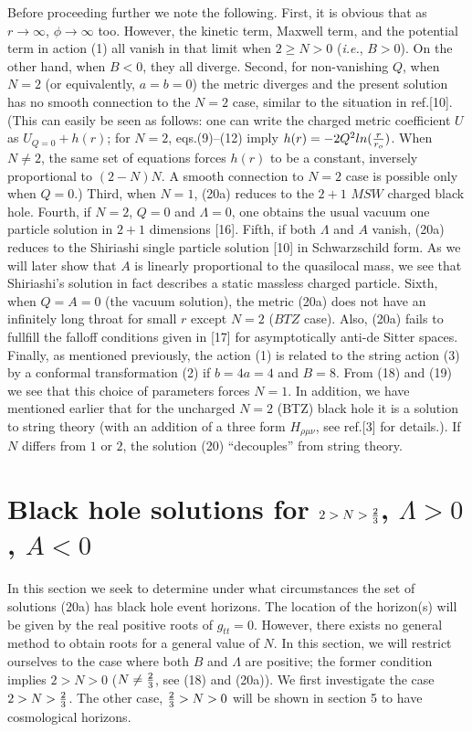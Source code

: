 Before proceeding further we note the following.
First, it is obvious that as $r\rightarrow\infty$,
$\phi\rightarrow\infty$ too. However, the kinetic term,
Maxwell term, and the potential term in action (1)
all vanish in that limit when $2\geq N>0$ ({\sl i.e.}, $B>0$).
On the other hand, when $B<0$, they all diverge. Second, for
non-vanishing $Q$, when $N=2$ (or equivalently, $a=b=0$)
the metric diverges and the
present solution has no smooth connection to the $N=2$ case, similar to the
situation in ref.[10]. (This can easily be seen as follows: one can
write the charged metric coefficient $U$ as $U_{Q=0}+h(r)$; for $N=2$,
eqs.(9)--(12) imply $h(r)=-2Q^2ln({r\over r_o})$. When $N\ne 2$, the same
set of equations forces $h(r)$ to be a constant, inversely proportional to
$(2-N)N$. A smooth connection to $N=2$ case is possible only when $Q=0$.)
Third, when $N=1$, (20a) reduces to the $2+1$ $MSW$ charged black hole.
Fourth, if $N=2$, $Q=0$ and $\Lambda=0$, one obtains the usual vacuum one
particle solution in $2+1$ dimensions [16]. Fifth, if both $\Lambda$ and
$A$ vanish, (20a) reduces to the Shiriashi single particle solution [10] in
Schwarzschild form. As we will later show that $A$ is linearly proportional
to the quasilocal mass, we see that Shiriashi's solution in fact describes
a static massless charged particle. Sixth, when $Q=A=0$ (the vacuum
solution), the metric (20a) does not have an infinitely long throat for small
$r$ except $N=2$ ($BTZ$ case). Also, (20a) fails to fullfill the falloff
conditions given in [17] for asymptotically anti-de Sitter spaces. Finally,
as mentioned previously, the action (1) is related to the string action (3)
by a conformal transformation (2) if $b=4a=4$ and $B=8$. From (18) and (19)
we see that this choice of parameters forces $N=1$. In addition,
we have mentioned earlier that for the uncharged $N=2$ (BTZ) black hole
it is a solution to string theory
(with an addition of a three form $H_{{\rho}{\mu}{\nu}}$,
see ref.[3] for details.). If $N$ differs from $1$ or $2$,
the solution (20) ``decouples'' from string theory.


\section{Black hole solutions for $2>N>{2\over 3}$, $\Lambda>0$,
		 $A<0$}

In this section we seek to determine under what circumstances the set of
solutions (20a) has black hole event horizons. The location of the
horizon(s) will be given by the real positive roots of $g_{tt}=0$.  However,
there exists no general method to obtain roots for a general value of $N$.
In this section, we will restrict ourselves to the case where both $B$ and
$\Lambda$ are positive; the former condition implies $2>N>0$ ($N\ne{2\over
3}$, see (18) and (20a)). We first investigate the case $2>N>{2\over3}$.
The other case, ${2\over 3}>N>0$ will be shown in section 5 to have
cosmological horizons.

